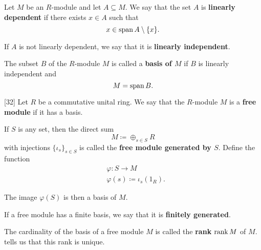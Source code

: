 \begin{definition}\label{def:linear_dependence}
  Let \( M \) be an \( R \)-module and let \( A \subseteq M \). We say that the set \( A \) is \textbf{linearly dependent} if there exists \( x \in A \) such that
  \begin{equation*}
    x \in \operatorname{span}{A} \setminus \{ x \}.
  \end{equation*}

  If \( A \) is not linearly dependent, we say that it is \textbf{linearly independent}.
\end{definition}

\begin{definition}\label{def:module_basis}
  The subset \( B \) of the \( R \)-module \( M \) is called a \textbf{basis of \( M \)} if \( B \) is linearly independent and
  \begin{equation*}
    M = \operatorname{span}{B}.
  \end{equation*}
\end{definition}

\begin{definition}\label{def:free_module}[32]\cite{Kocev2016}
  Let \( R \) be a commutative unital ring. We say that the \( R \)-module \( M \) is a \textbf{free module} if it has a basis.

  If \( S \) is any set, then the direct sum
  \begin{equation*}
    M \coloneqq \oplus_{s \in S} R
  \end{equation*}
  with injections \( \{ \iota_s \}_{s \in S} \) is called the \textbf{free module generated by \( S \)}. Define the function
  \begin{align*}
    &\varphi: S \to M \\
    &\varphi(s) \coloneqq \iota_s(1_R).
  \end{align*}

  The image \( \varphi(S) \) is then a basis of \( M \).

  If a free module has a finite basis, we say that it is \textbf{finitely generated}.

  The cardinality of the basis of a free module \( M \) is called the \textbf{rank} \( \operatorname{rank} M \) of \( M \).  tells us that this rank is unique.
\end{definition}

